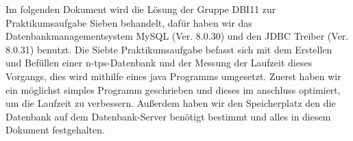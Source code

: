 Im folgenden Dokument wird die Lösung der Gruppe DBI11 zur Praktikumsaufgabe Sieben behandelt, dafür haben wir das Datenbankmanagementsystem MySQL (Ver. 8.0.30) und den JDBC Treiber (Ver. 8.0.31) benutzt.
Die Siebte Praktikumsaufgabe befasst sich mit dem Erstellen und Befüllen einer n-tps-Datenbank und der Messung der Laufzeit dieses Vorgangs, dies wird mithilfe eines java Programms umgesetzt.
Zuerst haben wir ein möglichst simples Programm geschrieben und dieses im anschluss optimiert, um die Laufzeit zu verbessern.
Außerdem haben wir den Speicherplatz den die Datenbank auf dem Datenbank-Server benötigt bestimmt und alles in diesem Dokument festgehalten.
